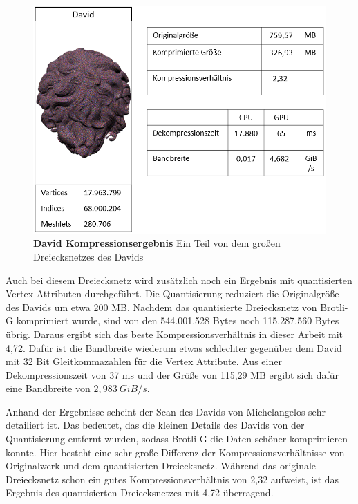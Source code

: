\begin{figure}[htb]
  \centering  
  \includegraphics[scale=0.75]{Bilder/ergebnisse/david.png}
  \caption[David Kompressionsergebnis]{\textbf{David Kompressionsergebnis} Ein Teil von dem großen Dreiecksnetzes des Davids }
  \label{fig:david_ergebnis}
\end{figure}

Auch bei diesem Dreiecksnetz wird zusätzlich noch ein Ergebnis mit quantisierten Vertex Attributen durchgeführt.
Die Quantisierung reduziert die Originalgröße des Davids um etwa 200 MB.
Nachdem das quantisierte Dreiecksnetz von Brotli-G komprimiert wurde, sind von den 544.001.528 Bytes noch 115.287.560 Bytes übrig.
Daraus ergibt sich das beste Kompressionsverhältnis in dieser Arbeit mit 4,72.
Dafür ist die Bandbreite wiederum etwas schlechter gegenüber dem David mit 32 Bit Gleitkommazahlen für die Vertex Attribute.
Aus einer Dekompressionszeit von 37 ms und der Größe von 115,29 MB ergibt sich dafür eine Bandbreite von $\mathit{2,983 \ GiB/s}$. \newline

Anhand der Ergebnisse scheint der Scan des Davids von Michelangelos sehr detailiert ist.
Das bedeutet, das die kleinen Details des Davids von der Quantisierung entfernt wurden, sodass Brotli-G die Daten schöner komprimieren konnte.
Hier besteht eine sehr große Differenz der Kompressionsverhältnisse von Originalwerk und dem quantisierten Dreiecksnetz.
Während das originale Dreiecksnetz schon ein gutes Kompressionsverhältnis von 2,32 aufweist, ist das Ergebnis des quantisierten Dreiecksnetzes mit 4,72 überragend.


